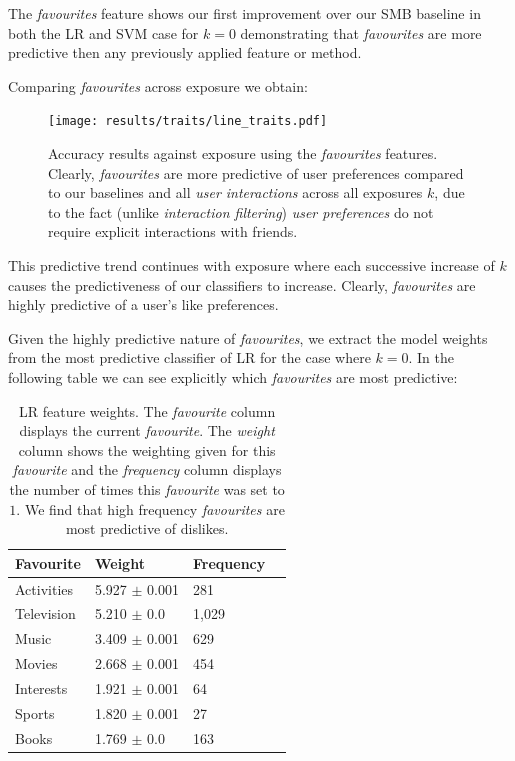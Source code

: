 \clearpage

The \emph{favourites} feature shows our first improvement over our SMB baseline in both the LR and SVM case for $k=0$ demonstrating that 
\emph{favourites} are more predictive then any previously applied feature or method.

Comparing \emph{favourites} across exposure we obtain:

\begin{figure}[h]
	\begin{center}
		\texttt{[image: results/traits/line\_traits.pdf]}
		\caption{Accuracy results against exposure using the \emph{favourites} features. Clearly, \emph{favourites} are more predictive of
				 user preferences compared to our baselines and all \emph{user interactions} across all exposures $k$, due to the fact 
				 (unlike \emph{interaction filtering}) \emph{user preferences} do not require explicit interactions with friends.}
	\end{center}
\end{figure}

This predictive trend continues with exposure where each successive increase of $k$ causes the predictiveness of our classifiers to increase. 
Clearly, \emph{favourites} are highly predictive of a user's like preferences.

\clearpage

Given the highly predictive nature of \emph{favourites}, we extract the model weights from the most predictive classifier of LR for the case where $k=0$.
In the following table we can see explicitly which \emph{favourites} are most predictive:

\begin{table}[h]
\begin{minipage}[b]{1.0\textwidth}
\centering
  \begin{tabular}{|l|l|l|l|} %
  \hline
  		\textbf{Favourite} & \textbf{Weight} & \textbf{Frequency} \\ \hline
		Activities & 5.927 $\pm$ 0.001 & 281 \\ \hline
		Television & 5.210 $\pm$ 0.0 & 1,029 \\ \hline
		Music & 3.409 $\pm$ 0.001 & 629 \\ \hline
		Movies & 2.668 $\pm$ 0.001 & 454 \\ \hline
		Interests & 1.921 $\pm$ 0.001 & 64 \\ \hline
		Sports & 1.820 $\pm$ 0.001 & 27 \\ \hline		
		Books & 1.769 $\pm$ 0.0 & 163 \\ \hline		
  \end{tabular}
  \caption{LR feature weights. The \emph{favourite} column displays the current \emph{favourite}.
  The \emph{weight} column shows the weighting given for this \emph{favourite} and the \emph{frequency} column displays the number of times 
  this \emph{favourite} was set to $1$. We find that high frequency \emph{favourites} are most predictive of dislikes.}
\end{minipage}
\end{table}

